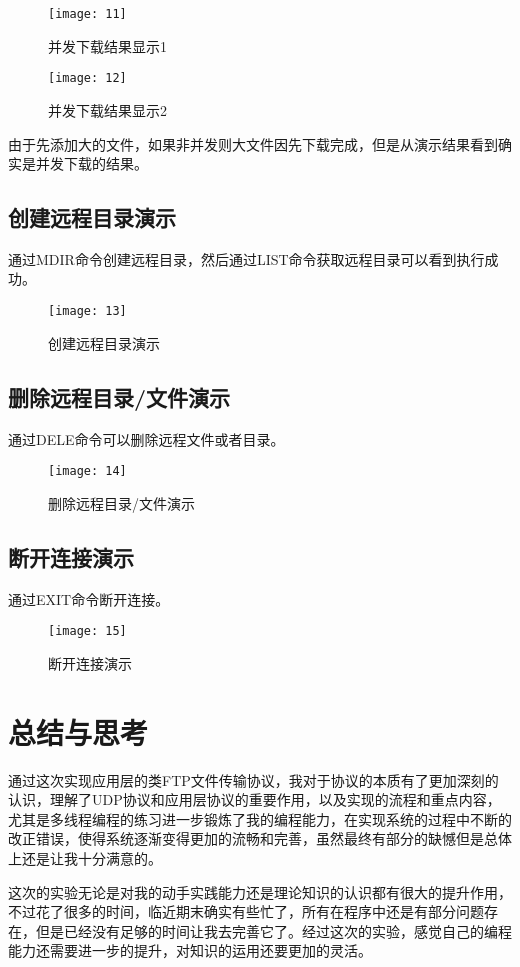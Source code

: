 \documentclass[lang=cn,11pt]{elegantpaper}
\begin{document}
\begin{figure}[H]
	\centering
	\texttt{[image: 11]}
	
	\caption{并发下载结果显示1 \label{fig:11}}
\end{figure}

\begin{figure}[H]
	\centering
	\texttt{[image: 12]}
	
	\caption{并发下载结果显示2 \label{fig:12}}
\end{figure}

由于先添加大的文件，如果非并发则大文件因先下载完成，但是从演示结果看到确实是并发下载的结果。

\subsection{创建远程目录演示}
通过MDIR命令创建远程目录，然后通过LIST命令获取远程目录可以看到执行成功。

\begin{figure}[H]
	\centering
	\texttt{[image: 13]}
	
	\caption{创建远程目录演示 \label{fig:13}}
\end{figure}

\subsection{删除远程目录/文件演示}
通过DELE命令可以删除远程文件或者目录。

\begin{figure}[H]
	\centering
	\texttt{[image: 14]}
	
	\caption{删除远程目录/文件演示 \label{fig:14}}
\end{figure}

\subsection{断开连接演示}
通过EXIT命令断开连接。

\begin{figure}[H]
	\centering
	\texttt{[image: 15]}
	
	\caption{断开连接演示 \label{fig:15}}
\end{figure}



\section{总结与思考}
通过这次实现应用层的类FTP文件传输协议，我对于协议的本质有了更加深刻的认识，理解了UDP协议和应用层协议的重要作用，以及实现的流程和重点内容，尤其是多线程编程的练习进一步锻炼了我的编程能力，在实现系统的过程中不断的改正错误，使得系统逐渐变得更加的流畅和完善，虽然最终有部分的缺憾但是总体上还是让我十分满意的。

这次的实验无论是对我的动手实践能力还是理论知识的认识都有很大的提升作用，不过花了很多的时间，临近期末确实有些忙了，所有在程序中还是有部分问题存在，但是已经没有足够的时间让我去完善它了。经过这次的实验，感觉自己的编程能力还需要进一步的提升，对知识的运用还要更加的灵活。


%
%
\end{document}
